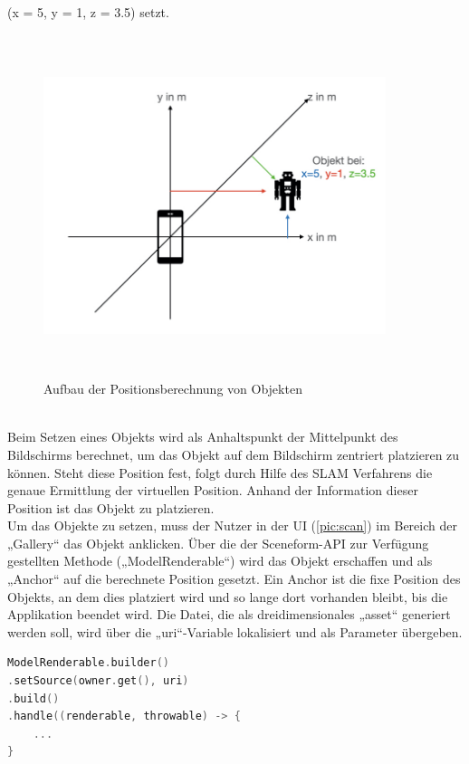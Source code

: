 (x = 5, y = 1, z = 3.5) setzt.
\begin{figure}[hbt!]
    \centering
    \includegraphics[width=10cm,height=10cm,keepaspectratio]{4Umsetzung/Bilder/koordin.jpeg}
    \caption{Aufbau der Positionsberechnung von Objekten}
    \label{pic:koordin}
\end{figure}
\pagebreak
\\ 
Beim Setzen eines Objekts wird als Anhaltspunkt der Mittelpunkt des Bildschirms berechnet, um das Objekt auf dem Bildschirm zentriert platzieren zu können. Steht diese 
Position fest, folgt durch Hilfe des \acs{SLAM} Verfahrens die genaue Ermittlung der virtuellen Position. Anhand der Information dieser Position 
ist das Objekt zu platzieren. 
\\ 
Um das Objekte zu setzen, muss der Nutzer in der \acs{UI} (\ref{pic:scan}) im Bereich der „Gallery“ das Objekt anklicken. 
Über die der Sceneform-\acs{API} zur Verfügung gestellten Methode („ModelRenderable“) wird das Objekt erschaffen und als „Anchor“ auf die berechnete Position 
gesetzt. Ein Anchor ist die fixe Position des Objekts, an dem dies platziert wird und so lange dort vorhanden bleibt, bis die Applikation beendet wird. Die Datei, 
die als dreidimensionales „asset“ generiert werden soll, wird über die „uri“-Variable lokalisiert und als Parameter übergeben. 
\\
\begin{lstlisting}[language=C,
    frame=lines,           % Ein Rahmen um den Code (single for box, lines for top and bottom)
    xleftmargin=\parindent,  % Rahmen link von den Zahlen
    style=algoBericht,
    label={code:modelrenderable},
    captionpos=b,           % Caption unter den Code setzen
caption={ModelRenderable Builder}]
ModelRenderable.builder()
.setSource(owner.get(), uri)
.build()
.handle((renderable, throwable) -> {
    ...
}
\end{lstlisting}                                    %
